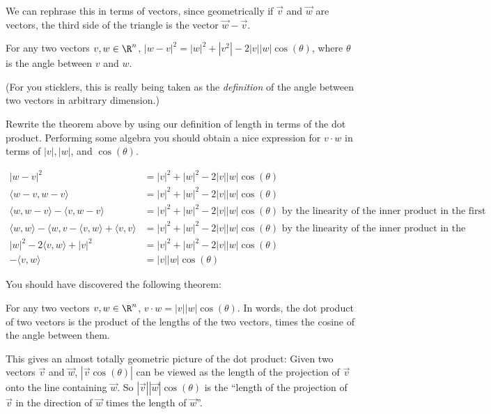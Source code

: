 \documentclass{ximera}
\begin{document}
We can rephrase this in terms of vectors, since geometrically if $\vec{v}$ and $\vec{w}$ are vectors, the third side of the triangle is the vector $\vec{w}-\vec{v}$.


\begin{theorem}
  For any two vectors $v,w \in \R^n$, $|w-v|^2 = |w|^2 +|v^2| - 2|v| |w| \cos(\theta) $, where $\theta$ is the angle between $v$ and $w$.
\end{theorem}

(For you sticklers, this is really being taken as the \textit{definition} of the angle between two vectors in arbitrary dimension.)

Rewrite the theorem above by using our definition of length in terms of the dot product.  Performing some algebra you should obtain a nice expression for $v\cdot w$ in terms of $|v|, |w|$, and $\cos(\theta)$.

\begin{free-response}
  \begin{align*}
    |w-v|^2 &= |v|^2+|w|^2 - 2|v||w|\cos(\theta)\\
    \langle w-v,w-v\rangle &= |v|^2+|w|^2- 2|v||w|\cos(\theta)\\
    \langle w,w-v\rangle-\langle v,w-v\rangle &= |v|^2+|w|^2- 2|v||w|\cos(\theta) \text{ by the linearity of the inner product in the first slot}\\
    \langle w,w\rangle - \langle{w,v} -\langle v,w \rangle + \langle v,v\rangle&= |v|^2+|w|^2- 2|v||w|\cos(\theta) \text{ by the linearity of the inner product in the second slot}\\
    |w|^2 - 2\langle v,w\rangle + |v|^2 &= |v|^2+|w|^2- 2|v||w|\cos(\theta)\\
    -\langle v,w\rangle &= |v||w|\cos(\theta)
  \end{align*}
\end{free-response} 

You should have discovered the following theorem:
 
\begin{theorem}
  For any two vectors $v,w \in \R^n$, $v \cdot w =
  |v||w|\cos(\theta)$.  In words, the dot product of two vectors is
  the product of the lengths of the two vectors, times the cosine of
  the angle between them.
\end{theorem}
 
This gives an almost totally geometric picture of the dot product:
Given two vectors $\vec{v}$ and $\vec{w}$, $|\vec{v}\cos(\theta)|$ can
be viewed as the length of the projection of $\vec{v}$ onto the line
containing $\vec{w}$.  So $|\vec{v}||\vec{w}|\cos(\theta)$ is the
``length of the projection of $\vec{v}$ in the direction of $\vec{w}$
times the length of $\vec{w}$''.
 
\end{document}
